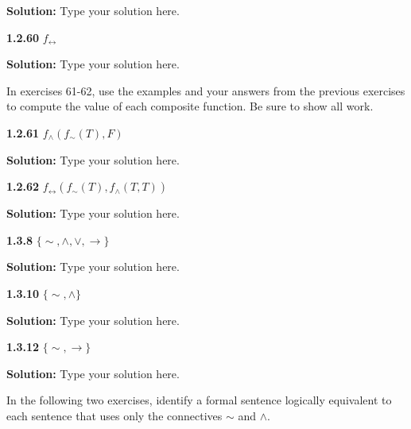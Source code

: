 \documentclass[12pt]{article}
\begin{document}
\doublespacing
\textbf{Solution:} Type your solution here.


\singlespacing
\vspace{12pt}

\noindent\textbf{1.2.60} $f_{\leftrightarrow}$

\doublespacing
\textbf{Solution:} Type your solution here.

\singlespacing
\vspace{12pt}

In exercises 61-62, use the examples and your answers from the previous exercises to compute the value of each composite function.  Be sure to show all work.

\vspace{12pt}

\noindent\textbf{1.2.61} $f_{\wedge}(f_{\sim}(T),F)$

\doublespacing
\textbf{Solution:} Type your solution here.


\singlespacing
\vspace{12pt}

\noindent\textbf{1.2.62} $f_{\leftrightarrow}(f_{\sim}(T),f_{\wedge}(T,T))$

\doublespacing
\textbf{Solution:} Type your solution here.


\singlespacing
\vspace{12pt}


\noindent\textbf{1.3.8} $\{\sim,\wedge,\vee,\rightarrow\}$

\doublespacing
\textbf{Solution:} Type your solution here.

\singlespacing
\vspace{12pt}

\noindent\textbf{1.3.10} $\{\sim,\wedge\}$

\doublespacing
\textbf{Solution:} Type your solution here.

\singlespacing
\vspace{12pt}

\noindent\textbf{1.3.12} $\{\sim,\rightarrow\}$

\doublespacing
\textbf{Solution:} Type your solution here.

\singlespacing
\vspace{12pt}

\newpage

In the following two exercises, identify a formal sentence logically equivalent to each sentence that uses only the connectives $\sim$ and $\wedge$.

\vspace{12pt}
\end{document}
